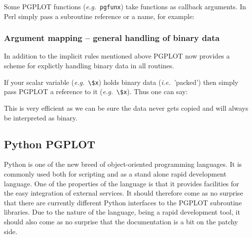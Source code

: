 \documentclass[twoside,11pt]{starlink}
\begin{document}
Some PGPLOT functions (\emph{e.g.\ }\texttt{pgfunx}) take functions as
callback arguments. In Perl simply pass a subroutine reference or a
name, for example:

\begin{small}
\end{small}

\subsubsection{Argument mapping -- general handling of binary data}

In addition to the implicit rules mentioned above PGPLOT now provides
a scheme for explictly handling binary data in all routines.

If your scalar variable (\emph{e.g.\ }\verb+\$x+) holds binary data
(\emph{i.e.\ }'packed') then simply pass PGPLOT a reference to it (\emph{e.g.\ }\verb+\$x+). Thus one can say:

\begin{small}
\end{small}

This is very efficient as we can be sure the data never gets copied
and will always be interpreted as binary.

\subsection{Python PGPLOT\label{sc15_pgpython}}

Python is one of the new breed of object-oriented programming
languages. It is commonly used both for scripting and as a stand alone
rapid development language. One of the properties of the language is
that it provides facilities for the easy integration of external
services. It should therefore come as no surprise that there are
currently
different Python interfaces to the PGPLOT subroutine libraries. Due to
the nature of the language, being a rapid development tool, it should
also come as no surprise that the documentation is a bit on the patchy
side.
\end{document}
